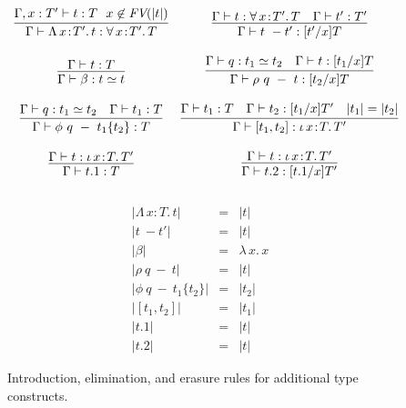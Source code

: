 \documentclass[acmsmall]{acmart}\settopmatter{}
\newcommand{\labfig}[1]{\label{fig:#1}}
\newcommand{\abs}[4]{{#1}\, #2\! : \! #3.\, #4}
\newcommand{\lam}[2]{\lambda\, #1.\, #2}
\begin{document}
\begin{figure}
\centering
{}  
  \[
  \begin{array}{cc}
    \infer{\Gamma\vdash \abs{\Lambda}{x}{T'}{t} : \abs{\forall}{x}{T'}{T}}{\Gamma,x:T'\vdash t : T & \!\!x\not\in\textit{FV}(|t|)} & 
    \infer{\Gamma\vdash t\ -t' : [t'/x]T}{\Gamma\vdash t : \abs{\forall}{x}{T'}{T} & \Gamma\vdash t':T'} \\ \\

    \infer{\Gamma\vdash \beta : t \simeq t}{\Gamma\vdash t : T} &
    \infer{\Gamma\vdash \rho\ q\ -\ t : [t_2/x]T}{\Gamma\vdash q : t_1 \simeq t_2 & \Gamma \vdash t : [t_1/x]T} \\ \\

    \infer{\Gamma\vdash \phi\ q\ -\ t_1 \{t_2\} : T}{\Gamma\vdash q : t_1 \simeq t_2 & \Gamma \vdash t_1 : T} &
    \infer{\Gamma\vdash [t_1,t_2] : \abs{\iota}{x}{T}{T'}}{\Gamma\vdash t_1 : T & \Gamma\vdash t_2 : [t_1/x]T' & |t_1| = |t_2|} \\ \\

    \infer{\Gamma\vdash t.1 : T}{\Gamma\vdash t : \abs{\iota}{x}{T}{T'}} &
    \infer{\Gamma\vdash t.2 : [t.1/x]T'}{\Gamma\vdash t : \abs{\iota}{x}{T}{T'}} \\ \\

  \end{array}
  \]
\endminipage\hfill 
{}
\[
  \begin{array}{lll}
    |\abs{\Lambda}{x}{T}{t}| & = & |t| \\
    |t\ -t'| & = & |t| \\
    |\beta| & = & \lam{x}{x} \\
    |\rho\ q\ - \ t| & = & |t| \\
    |\phi\ q\ - \ t_1 \{t_2\}| & = & |t_2| \\
    |[t_1,t_2]| & = & |t_1| \\
    |t.1| & = & |t| \\
    |t.2| & = & |t| 
  \end{array}
  \]
\endminipage
\caption{Introduction, elimination, and erasure rules for additional type constructs.}
\labfig{cdle}
\end{figure}
\end{document}
